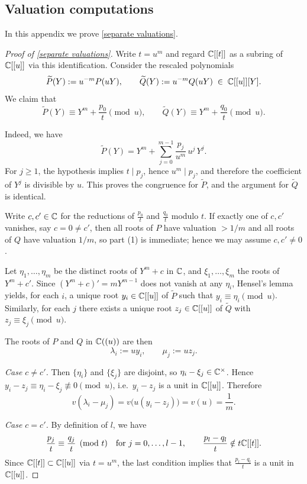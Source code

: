 \documentclass[11pt]{article}
\numberwithin{equation}{section}
\begin{document}
\begin{appendix}
    \appendix

\section{Valuation computations}
In this appendix we prove \cref{separate valuations}.
\begin{proof}[Proof of \cref{separate valuations}]
Write $t=u^m$ and regard $\mathbb{C}[[t]]$ as a subring of $\mathbb{C}[[u]]$ via this identification.
Consider the rescaled polynomials
\[
\widetilde P(Y):=u^{-m}P(uY),\qquad 
\widetilde Q(Y):=u^{-m}Q(uY)
\;\in\; \mathbb{C}[[u]][Y].
\]
We claim that
\[
\widetilde P(Y)\equiv Y^m+\frac{p_0}{t} \pmod{u},
\qquad 
\widetilde Q(Y)\equiv Y^m+\frac{q_0}{t} \pmod{u}.
\]

Indeed, we have
\[
\widetilde P(Y)
=Y^m+\sum_{j=0}^{m-1} \frac{p_j}{u^m}\,u^{j}\,Y^j.
\]
For $j\ge 1$, the hypothesis implies $t\mid p_j$, hence
$u^m\mid p_j$, and therefore the coefficient of $Y^j$
is divisible by $u$. This proves the congruence for
$\widetilde P$, and the argument for $\widetilde Q$ is identical.

Write $c,c'\in \mathbb{C}$ for the reductions of $\frac{p_0}{t}$ and
$\frac{q_0}{t}$ modulo $t$. If exactly one of $c,c'$ vanishes, say $c=0\neq c'$, then all roots of $P$ have valuation $>1/m$ and all roots of $Q$ have valuation $1/m$, so part (1) is immediate; hence we may assume $c,c'\neq0$.

Let $\eta_1,\dots,\eta_m$ be the distinct roots of $Y^m+c$ in $\mathbb{C}$,
and $\xi_1,\dots,\xi_m$ the roots of $Y^m+c'$.
Since $(Y^m+c)'=mY^{m-1}$ does not vanish at any $\eta_i$,
Hensel's lemma yields, for each $i$, a unique root
$y_i\in \mathbb{C}[[u]]$ of $\widetilde P$ such that
$y_i\equiv \eta_i\pmod{u}$.
Similarly, for each $j$ there exists a unique root
$z_j\in \mathbb{C}[[u]]$ of $\widetilde Q$ with
$z_j\equiv \xi_j\pmod{u}$.

The roots of $P$ and $Q$ in $\mathbb{C}((u))$ are then
\[
\lambda_i:=u y_i,
\qquad
\mu_j:=u z_j.
\]


\smallskip
\noindent\emph{Case $c\neq c'$.}
Then $\{\eta_i\}$ and $\{\xi_j\}$ are disjoint, so $\eta_i-\xi_j\in\mathbb{C}^\times$.
Hence $y_i-z_j\equiv \eta_i-\xi_j\not\equiv 0\pmod{u}$, i.e.\ $y_i-z_j$ is a unit in
$\mathbb{C}[[u]]$. Therefore
\[
v(\lambda_i-\mu_j)=v\bigl(u(y_i-z_j)\bigr)=v(u)=\frac{1}{m}.
\]

\smallskip
\noindent\emph{Case $c=c'$.} By definition of $l$, we have
\[
\frac{p_j}{t} \equiv \frac{q_j}{t} \pmod{t}
\quad\text{for } j=0,\dots,l-1,
\qquad
\frac{p_l-q_l}{t} \notin t\mathbb{C}[[t]].
\]
Since $\mathbb{C}[[t]]\subset \mathbb{C}[[u]]$ via $t=u^m$, the last condition
implies that $\frac{p_l-q_l}{t}$ is a unit in $\mathbb{C}[[u]]$.


\end{proof}
\end{appendix}
\end{document}
